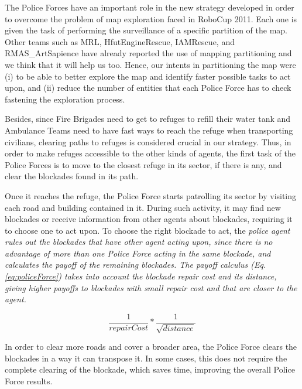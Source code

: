 The Police Forces have an important role in the new strategy developed in order to overcome the problem of map exploration faced in RoboCup 2011. Each one is given the task of performing the surveillance of a specific partition of the map. Other teams such as MRL, HfutEngineRescue, IAMRescue, and RMAS\_ArtSapience have already reported the use of mapping partitioning and we think that it will help us too. Hence, our intents in partitioning the map were (i) to be able to better explore the map and identify faster possible tasks to act upon, and (ii) reduce the number of entities that each Police Force has to check fastening the exploration process.

Besides, since Fire Brigades need to get to refuges to refill their water tank and Ambulance Teams need to have fast ways to reach the refuge when transporting civilians, clearing paths to refuges is considered crucial in our strategy. Thus, in order to make refuges accessible to the other kinds of agents, the first task of the Police Forces is to move to the closest refuge in its sector, if there is any, and clear the blockades found in its path.

Once it reaches the refuge, the Police Force starts patrolling its sector by visiting each road and building contained in it. During such activity, it may find new blockades or receive information from other agents about blockades, requiring it to choose one to act upon. To choose the right blockade to act, the \it{police} agent rules out the blockades that have other agent acting upon, since there is no advantage of more than one Police Force acting in the same blockade, and calculates the payoff of the remaining blockades. The payoff calculus (Eq. \ref{eq:policeForce}) takes into account the blockade repair cost and its distance, giving higher payoffs to blockades with small repair cost and that are closer to the agent.

\begin{equation}
\label{eq:policeForce}
\frac{1}{repairCost} * \frac{1}{\sqrt{distance}}
\end{equation}

In order to clear more roads and cover a broader area, the Police Force clears the blockades in a way it can transpose it. In some cases, this does not require the complete clearing of the blockade, which saves time, improving the overall Police Force results.
